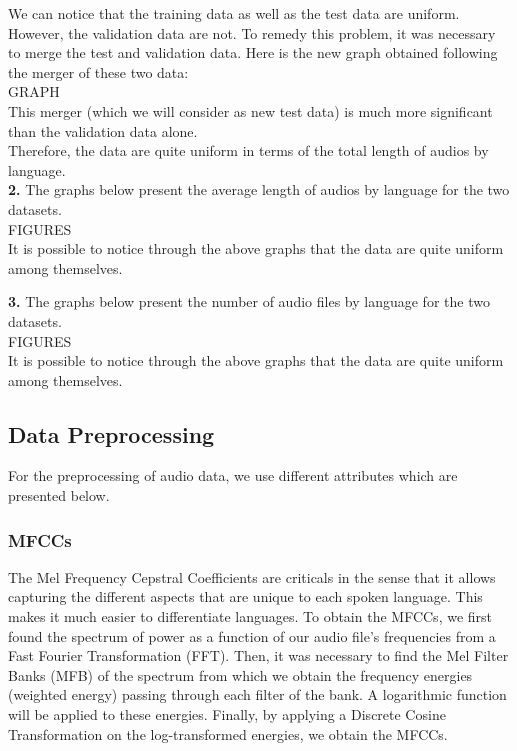 \documentclass[11pt]{article}
\begin{document}
We can notice that the training data as well as the test data are uniform. However, the validation data are not. To remedy this problem, it was necessary to merge the test and validation data. Here is the new graph obtained following the merger of these two data:\\

GRAPH\\

This merger (which we will consider as new test data) is much more significant than the validation data alone.\\
Therefore, the data are quite uniform in terms of the total length of audios by language.\\

\textbf{2.} The graphs below present the average length of audios by language for the two datasets.\\

FIGURES\\

It is possible to notice through the above graphs that the data are quite uniform among themselves.

\textbf{3.} The graphs below present the number of audio files by language for the two datasets.\\

FIGURES\\

It is possible to notice through the above graphs that the data are quite uniform among themselves.


\subsection{Data Preprocessing}
For the preprocessing of audio data, we use different attributes which are presented below.

\subsubsection{MFCCs}
The Mel Frequency Cepstral Coefficients are criticals in the sense that it allows capturing the different aspects that are unique to each spoken language. This makes it much easier to differentiate languages. To obtain the MFCCs, we first found the spectrum of power as a function of our audio file's frequencies from a Fast Fourier Transformation (FFT). Then, it was necessary to find the Mel Filter Banks (MFB) of the spectrum from which we obtain the frequency energies (weighted energy) passing through each filter of the bank. A logarithmic function will be applied to these energies. Finally, by applying a Discrete Cosine Transformation on the log-transformed energies, we obtain the MFCCs.\\
\end{document}
